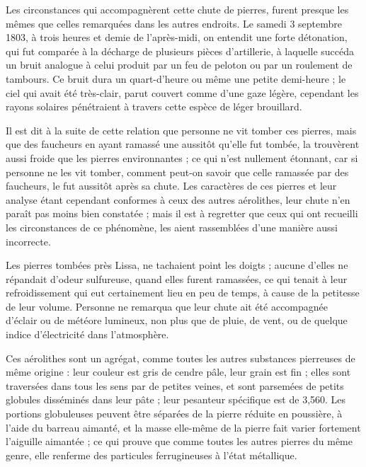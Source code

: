 \documentclass[a4paper, 12pt, oneside, french]{article}
\begin{document}
\og Les circonstances qui accompagnèrent cette chute de pierres, furent presque les mêmes que celles remarquées dans les autres endroits. Le samedi 3 septembre 1803, à trois heures et demie de l'après-midi, on entendit une forte détonation, qui fut comparée à la décharge de plusieurs pièces d'artillerie, à laquelle succéda un bruit analogue à celui produit par un feu de peloton ou par un roulement de tambours. Ce bruit dura un quart-d'heure ou même une petite demi-heure ; le ciel qui avait été très-clair, parut couvert comme d'une gaze légère, cependant les rayons solaires pénétraient à travers cette espèce de léger brouillard. \fg

Il est dit à la suite de cette relation que personne ne vit tomber ces pierres, mais que des faucheurs en ayant ramassé une aussitôt qu'elle fut tombée, la trouvèrent aussi froide que les pierres environnantes ; ce qui n'est nullement étonnant, car si personne ne les vit tomber, comment peut-on savoir que celle ramassée par des faucheurs, le fut aussitôt après sa chute. Les caractères de ces pierres et leur analyse étant cependant conformes à ceux des autres aérolithes, leur chute n'en paraît pas moins bien constatée ; mais il est à regretter que ceux qui ont recueilli les circonstances de ce phénomène, les aient rassemblées d'une manière aussi incorrecte.

Les pierres tombées près Lissa, ne tachaient point les doigts ; aucune d'elles ne répandait d'odeur sulfureuse, quand elles furent ramassées, ce qui tenait à leur refroidissement qui eut certainement lieu en peu de temps, à cause de la petitesse de leur volume. Personne ne remarqua que leur chute ait été accompagnée d'éclair ou de météore lumineux, non plus que de pluie, de vent, ou de quelque indice d'électricité dans l'atmosphère.

Ces aérolithes sont un agrégat, comme toutes les autres substances pierreuses de même origine : leur couleur est gris de cendre pâle, leur grain est fin ; elles sont traversées dans tous les sens par de petites veines, et sont parsemées de petits globules disséminés dans leur pâte ; leur pesanteur spécifique est de 3,560. Les portions globuleuses peuvent être séparées de la pierre réduite en poussière, à l'aide du barreau aimanté, et la masse elle-même de la pierre fait varier fortement l'aiguille aimantée ; ce qui prouve que comme toutes les autres pierres du même genre, elle renferme des particules ferrugineuses à l'état métallique.
\end{document}
